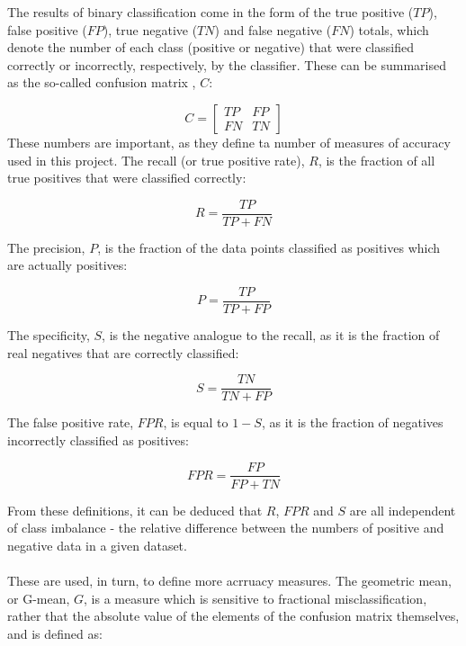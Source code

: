 \documentclass[12pt]{article}
\begin{document}
The results of binary classification come in the form of the true positive ($TP$), false positive ($FP$), true negative ($TN$) and false negative ($FN$) totals, which denote the number of each class (positive or negative) that were classified correctly or incorrectly, respectively, by the classifier. These can be summarised as the so-called confusion matrix \cite{kubat1998machine}, $C$:

\[
C =
  \begin{bmatrix}
    TP & FP \\
    FN & TN
  \end{bmatrix}
\]
These numbers are important, as they define ta number of measures of accuracy \cite{lyon2016fifty} used in this project. The recall (or true positive rate), $R$, is the fraction of all true positives that were classified correctly:

\begin{equation}
R = \frac{TP}{TP + FN}
\label{recall}
\end{equation}

The precision, $P$, is the fraction of the data points classified as positives which are actually positives:

\begin{equation}
P = \frac{TP}{TP + FP}
\label{prec}
\end{equation}

The specificity, $S$, is the negative analogue to the recall, as it is the fraction of real negatives that are correctly classified:

\begin{equation}
S = \frac{TN}{TN + FP}
\label{spec}
\end{equation}

The false positive rate, $FPR$, is equal to $1 - S$, as it is the fraction of negatives incorrectly classified as positives:

\begin{equation}
FPR = \frac{FP}{FP + TN}
\label{FPR}
\end{equation}

From these definitions, it can be deduced that $R$, $FPR$ and $S$ are all independent of class imbalance - the relative difference between the numbers of positive and negative data in a given dataset.
\paragraph{}
These are used, in turn, to define more acrruacy measures. The geometric mean, or G-mean, $G$, is a measure which is sensitive to fractional misclassification, rather that the absolute value of the elements of the confusion matrix themselves, \cite{kubat1998machine} and is defined as:
\end{document}
